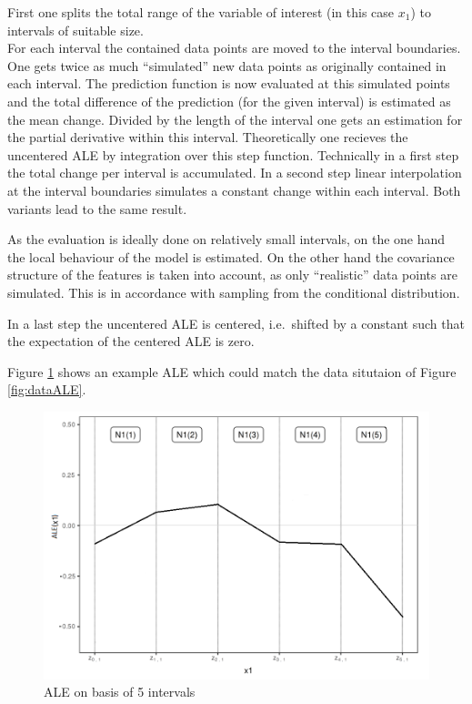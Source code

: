 \documentclass[]{krantz}
\begin{document}
First one splits the total range of the variable of interest (in this
case \(x_1\)) to intervals of suitable size.\\
For each interval the contained data points are moved to the interval
boundaries. One gets twice as much ``simulated'' new data points as
originally contained in each interval. The prediction function is now
evaluated at this simulated points and the total difference of the
prediction (for the given interval) is estimated as the mean change.
Divided by the length of the interval one gets an estimation for the
partial derivative within this interval. Theoretically one recieves the
uncentered ALE by integration over this step function. Technically in a
first step the total change per interval is accumulated. In a second
step linear interpolation at the interval boundaries simulates a
constant change within each interval. Both variants lead to the same
result.

As the evaluation is ideally done on relatively small intervals, on the
one hand the local behaviour of the model is estimated. On the other
hand the covariance structure of the features is taken into account, as
only ``realistic'' data points are simulated. This is in accordance with
sampling from the conditional distribution.

In a last step the uncentered ALE is centered, i.e.~shifted by a
constant such that the expectation of the centered ALE is zero.

Figure \ref{fig:aleEx} shows an example ALE which could match the data
situtaion of Figure \ref{fig:dataALE}.

\begin{figure}
\includegraphics[width=1\linewidth]{images/ale_example} \caption{ALE on basis of 5 intervals}\label{fig:aleEx}
\end{figure}
\end{document}
